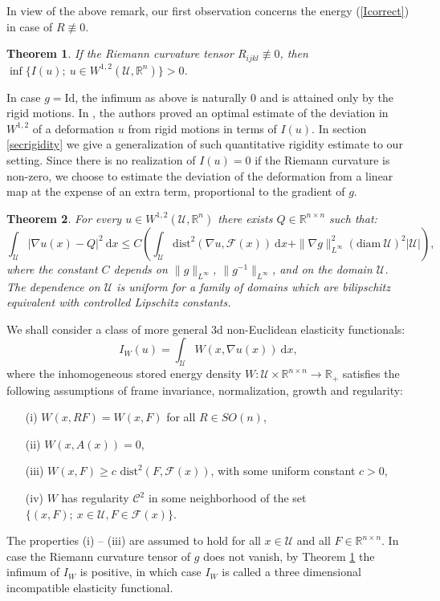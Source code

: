 \documentclass[leqno,twoside, 11pt]{amsart}
\theoremstyle{plain}
\newtheorem{theorem}{Theorem}[section]
\theoremstyle{definition}
\numberwithin{equation}{section}
\numberwithin{figure}{section}
\begin{document}
In view of the above remark, our first observation concerns the energy
(\ref{Icorrect}) in case of $R\not\equiv 0$.

\begin{theorem}\label{thbound_below}
If the Riemann curvature tensor $R_{ijkl} \not\equiv 0$, then
$\inf\Big\{I(u); ~u\in W^{1,2}(\mathcal{U},\mathbb{R}^n)\Big\}>0$.
\end{theorem}

In case $g= \mbox{Id}$, the infimum as above is naturally $0$ and is attained only by
the rigid motions. In \cite{FJMgeo}, the authors
proved an optimal estimate of the deviation  in $W^{1,2}$ of a deformation $u$
from rigid motions in terms of $I(u)$. In section \ref{secrigidity} 
we give a generalization of such quantitative
rigidity estimate to our setting. Since there is no realization of $I(u) =0$ 
if the Riemann curvature is non-zero, we choose to estimate the
deviation of the deformation from a linear map at the expense of an
extra term, proportional to the gradient of $g$.

\begin{theorem}\label{rigidity_main}
For every $u\in W^{1,2}(\mathcal{U},\mathbb{R}^n)$ there exists
$Q\in\mathbb{R}^{n\times n}$ such that:
$$\int_{\mathcal{U}}|\nabla u(x) - Q|^2~\mathrm{d}x\leq
C \left(\int_{\mathcal{U}} \mathrm{dist}^2(\nabla u,
\mathcal{F}(x))~\mathrm{d}x
+ \|\nabla g\|_{L^\infty}^2 (\mathrm{diam } ~\mathcal{U})^2 
|\mathcal{U}|\right),$$
where the constant $C$ depends on $\|g\|_{L^\infty}$, $\|g^{-1}\|_{L^\infty}$,
and on the domain $\mathcal{U}$. The dependence on $\mathcal{U}$ is uniform for a family
of domains which are bilipschitz equivalent with controlled Lipschitz constants.
\end{theorem}
 
We shall consider a class of more general $3$d non-Euclidean elasticity
functionals:
\begin{equation*}
I_W(u) =  \int_{\mathcal{U}} W(x,\nabla u(x))~\mbox{d}x,
\end{equation*}
where the inhomogeneous stored energy density
$W:\mathcal{U}\times \mathbb{R}^{n\times n}\longrightarrow \mathbb{R}_+$
satisfies the following assumptions of frame
invariance, normalization, growth and regularity:
\begin{itemize}
\item[(i)] $W(x, RF) = W(x,F)$ for all $R\in SO(n)$,
\item[(ii)] $W(x, A(x)) = 0$,
\item[(iii)] $W(x,F) \geq c \mbox{ dist}^2(F,\mathcal{F}(x))$, with some
uniform constant $c>0$,
\item[(iv)] $W$ has regularity $\mathcal{C}^2$ in some neighborhood of the set
$\{(x,F); ~ x\in\mathcal{U}, F\in \mathcal{F}(x)\}$.
\end{itemize}
The properties (i) -- (iii) are assumed to hold for all $x\in \mathcal{U}$
and all $F\in \mathbb{R}^{n\times n}$. In case the Riemann curvature tensor of
$g$ does not vanish, by Theorem \ref{thbound_below} the infimum of $I_W$
is positive, in which case $I_W$ is called a three dimensional
incompatible elasticity functional.
\end{document}
